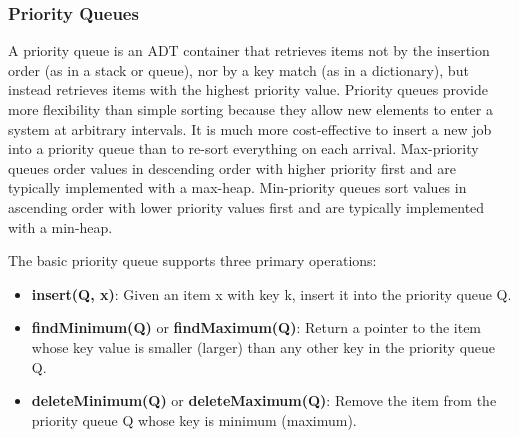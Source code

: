 \documentclass{article}
\begin{document}
    
    \subsubsection{Priority Queues}
    A priority queue is an ADT container that retrieves items not by the insertion order (as in a stack or queue), nor by a key match (as in a dictionary), but instead retrieves items with the highest priority value. Priority queues provide more flexibility than simple sorting because they allow new elements to enter a system at arbitrary intervals. It is much more cost-effective to insert a new job into a priority queue than to re-sort everything on each arrival. Max-priority queues order values in descending order with higher priority first and are typically implemented with a max-heap. Min-priority queues sort values in ascending order with lower priority values first and are typically implemented with a min-heap.
    
    The basic priority queue supports three primary operations:
    \begin{itemize}
        \item \textbf{insert(Q, x)}: Given an item x with key k, insert it into the priority queue Q.
        \item \textbf{findMinimum(Q)} or \textbf{findMaximum(Q)}: Return a pointer to the item whose key value is smaller (larger) than any other key in the priority queue Q.
        \item \textbf{deleteMinimum(Q)} or \textbf{deleteMaximum(Q)}: Remove the item from the priority queue Q whose key is minimum (maximum).
    \end{itemize}
\end{document}

